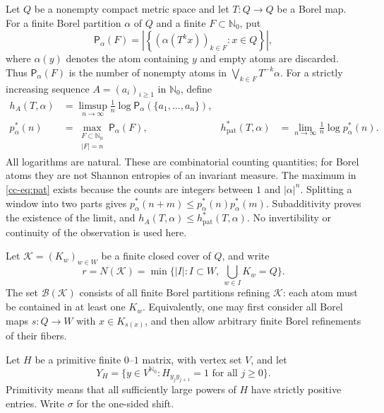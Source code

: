 \documentclass[11pt,reqno]{amsart}
\numberwithin{equation}{section}
\theoremstyle{definition}
\newcommand{\Nzero}{\mathbb N_0}
\newcommand{\Patt}{\mathsf P}
\newcommand{\hpat}{h_{\mathrm{pat}}^{*}}
\newcommand{\K}{\mathcal K}
\begin{document}
Let $Q$ be a nonempty compact metric space and let $T:Q\to Q$ be a Borel
map. For a finite Borel partition $\alpha$ of $Q$ and a finite
$F\subset\Nzero$, put
\[
 \Patt_\alpha(F)=
 \left|\left\{(\alpha(T^k x))_{k\in F}:x\in Q\right\}\right|,
\]
where $\alpha(y)$ denotes the atom containing $y$ and empty atoms are
discarded. Thus $\Patt_\alpha(F)$ is the number of nonempty atoms in
$\bigvee_{k\in F}T^{-k}\alpha$. For a strictly increasing sequence
$A=(a_i)_{i\ge1}$ in $\Nzero$, define
\begin{align}
 h_A(T,\alpha)&=\limsup_{n\to\infty}\frac1n
       \log\Patt_\alpha(\{a_1,\ldots,a_n\}),\label{cc-eq:seq}\\
 p_\alpha^*(n)&=\max_{\substack{F\subset\Nzero\\ |F|=n}}
                    \Patt_\alpha(F),
 &\hpat(T,\alpha)&=\lim_{n\to\infty}\frac1n\log p_\alpha^*(n).
 \label{cc-eq:pat}
\end{align}
All logarithms are natural. These are combinatorial counting quantities;
for Borel atoms they are not Shannon entropies of an invariant measure.
The maximum in \eqref{cc-eq:pat} exists because the counts are integers
between $1$ and $|\alpha|^n$. Splitting a window into two parts gives
$p_\alpha^*(n+m)\le p_\alpha^*(n)p_\alpha^*(m)$. Subadditivity proves the
existence of the limit, and $h_A(T,\alpha)\le\hpat(T,\alpha)$.
No invertibility or continuity of the observation is used here.

Let $\K=(K_w)_{w\in W}$ be a finite closed cover of $Q$, and write
\[
 r=N(\K)=\min\{|I|:I\subset W,\ \bigcup_{w\in I}K_w=Q\}.
\]
The set $\mathcal B(\K)$ consists of all finite Borel partitions refining
$\K$: each atom must be contained in at least one $K_w$. Equivalently,
one may first consider all Borel maps $s:Q\to W$ with $x\in K_{s(x)}$,
and then allow arbitrary finite Borel refinements of their fibers.

Let $H$ be a primitive finite $0$--$1$ matrix, with vertex set $V$, and
let
\[
 Y_H=\{y\in V^{\Nzero}:H_{y_jy_{j+1}}=1\text{ for all }j\ge0\}.
\]
Primitivity means that all sufficiently large powers of $H$ have strictly
positive entries. Write $\sigma$ for the one-sided shift.
\end{document}
